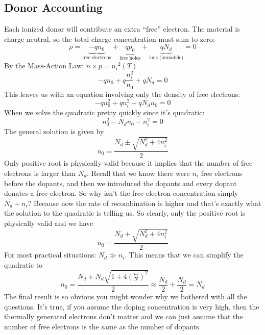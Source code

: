 \subsection{Donor Accounting}
Each ionized donor will contribute an extra “free” electron.  The material is charge neutral, so the total charge concentration must sum to zero:
\begin{equation}
        \rho  =  \underbrace{- q{n_0}}_{\text{free electrons}}
        + \underbrace{q{p_0}}_{\text{free holes}} +
        \underbrace{q{N_d}}_{\text{ions (immobile)}}  = 0
\end{equation}
By the Mass-Action Law:  $n \times p = {n_i}^2(T)$
\begin{equation}
         - q{n_0} + q\frac{{n_i^2}}{{{n_0}}} + q{N_d} = 0
\end{equation}
This leaves us with an equation involving only the density of free electrons:
\begin{equation}
- qn_0^2 + qn_i^2 + q{N_d}{n_0} = 0
\end{equation}
When we solve the quadratic pretty quickly since it’s quadratic:
\begin{equation}
n_0^2 - {N_d}{n_0} - n_i^2 = 0
\end{equation}
The general solution is given by
\begin{equation}
        {n_0} = \frac{{{N_d} \pm \sqrt {N_d^2 + 4n_i^2} }}{2}
\end{equation}
Only positive root is physically valid because it implies that the number of free electrons is larger than $N_d$.  Recall that we know there were $n_i$ free electrons before the dopants, and then we introduced the dopants and every dopant donates a free electron.  So why isn’t the free electron concentration simply $N_d + n_i$?  Because now the rate of recombination is higher and that’s exactly what the solution to the quadratic is telling us.  So clearly, only the positive root is physically valid and we have
\begin{equation}
        {n_0} = \frac{{{N_d} + \sqrt {N_d^2 + 4n_i^2} }}{2}
\end{equation}
For most practical situations:  ${N_d} \gg {n_i}$.  This means that we can simplify the quadratic to 
\begin{equation}
{n_0} = \frac{{{N_d} + {N_d}\sqrt {1 + 4{{\left( {\frac{{{n_i}}}{N}} \right)}^2}} }}{2} \approx \frac{{{N_d}}}{2} + \frac{{{N_d}}}{2} = {N_d}
\end{equation}
The final result is so obvious you might wonder why we bothered with all the questions.  It’s true, if you assume the doping concentration is very high, then the thermally generated electrons don’t matter and we can just assume that the number of free electrons is the same as the number of dopants.
